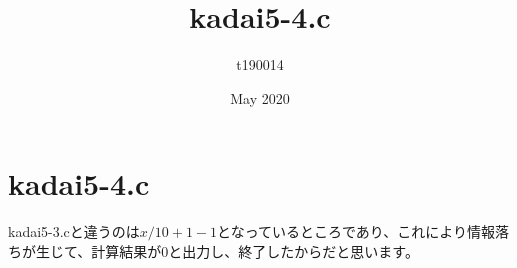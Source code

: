\documentclass{article}
\title{kadai5-4.c}
\author{t190014 }
\date{May 2020}
\begin{document}
\maketitle

\section{kadai5-4.c}
kadai5-3.cと違うのは$x / 10 + 1 - 1$となっているところであり、これにより情報落ちが生じて、計算結果が$0$と出力し、終了したからだと思います。
\end{document}
